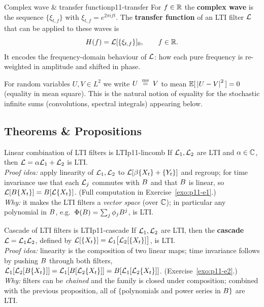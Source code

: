 \begin{definition}{Complex wave \& transfer function}{p11-transfer}
For $f\in\mathbb{R}$ the \textbf{complex wave} is the sequence
$\{\xi_{t,f}\}$ with $\xi_{t,f}=e^{2\pi i f t}$. The \textbf{transfer function}
of an LTI filter $\mathcal{L}$ that can be applied to these waves is
\[
H(f)=\mathcal{L}[\{\xi_{t,f}\}]_0,\qquad f\in\mathbb{R} .
\]
It encodes the frequency-domain behaviour of $\mathcal{L}$: how each pure frequency is
re-weighted in amplitude and shifted in phase.
\end{definition}

\begin{recallbox}
For random variables $U,V\in L^2$ we write $U\;\overset{\mathrm{ms}}{=}\; V$ to mean
$\mathbb{E}[\,\left\lvert U-V \right\rvert^2\,]=0$ (equality in mean square). This is the natural notion of
equality for the stochastic infinite sums (convolutions, spectral integrals)
appearing below.
\end{recallbox}

\subsection{Theorems \& Propositions}

\begin{proposition}{Linear combination of LTI filters is LTI}{p11-lincomb}
If $\mathcal{L}_1,\mathcal{L}_2$ are LTI and $\alpha\in\mathbb{C}$, then
$\mathcal{L}=\alpha\mathcal{L}_1+\mathcal{L}_2$ is LTI.\\[2pt]
\textit{Proof idea:} apply linearity of $\mathcal{L}_1,\mathcal{L}_2$ to
$\mathcal{L}[\beta\{X_t\}+\{Y_t\}]$ and regroup; for time invariance use that each
$\mathcal{L}_j$ commutes with $B$ and that $B$ is linear, so
$\mathcal{L}[B\{X_t\}]=B[\mathcal{L}\{X_t\}]$. (Full computation in
Exercise~\ref{exo:p11-e1}.)\\
\textit{Why:} it makes the LTI filters a \emph{vector space} (over $\mathbb{C}$); in
particular any polynomial in $B$, e.g.\ $\Phi(B)=\sum_j\phi_jB^j$, is
LTI.
\end{proposition}

\begin{proposition}{Cascade of LTI filters is LTI}{p11-cascade}
If $\mathcal{L}_1,\mathcal{L}_2$ are LTI, then the \textbf{cascade}
$\mathcal{L}=\mathcal{L}_1\mathcal{L}_2$, defined by
$\mathcal{L}[\{X_t\}]=\mathcal{L}_1\big[\mathcal{L}_2[\{X_t\}]\big]$, is LTI.\\[2pt]
\textit{Proof idea:} linearity is the composition of two linear maps; time
invariance follows by pushing $B$ through both filters,
$\mathcal{L}_1[\mathcal{L}_2[B\{X_t\}]]=\mathcal{L}_1[B[\mathcal{L}_2\{X_t\}]]
=B[\mathcal{L}_1[\mathcal{L}_2\{X_t\}]]$. (Exercise~\ref{exo:p11-e2}.)\\
\textit{Why:} filters can be \emph{chained} and the family is closed under
composition; combined with the previous proposition, all of $\{$polynomials and
power series in $B\}$ are LTI.
\end{proposition}

